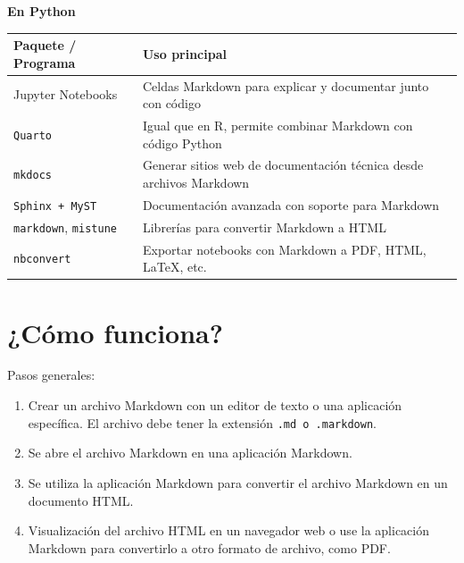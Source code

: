 \documentclass[
  spanish,
  12pt,
  letterpaper,
  DIV=11,
  numbers=noendperiod]{scrreprt}
\newcounter{none} %
\providecommand{\tightlist}{%
  \setlength{\itemsep}{0pt}\setlength{\parskip}{0pt}}
\begin{document}
\textbf{En Python}

{\def\LTcaptype{none} %
\begin{longtable}[]{@{}
  >{\raggedright\arraybackslash}p{}
  >{\raggedright\arraybackslash}p{}@{}}
\toprule\noalign{}
\begin{minipage}[b]{\linewidth}\raggedright
Paquete / Programa
\end{minipage} & \begin{minipage}[b]{\linewidth}\raggedright
Uso principal
\end{minipage} \\
\midrule\noalign{}
\endhead
\bottomrule\noalign{}
\endlastfoot
Jupyter Notebooks & Celdas Markdown para explicar y documentar junto con
código \\
\texttt{Quarto} & Igual que en R, permite combinar Markdown con código
Python \\
\texttt{mkdocs} & Generar sitios web de documentación técnica desde
archivos Markdown \\
\texttt{Sphinx\ +\ MyST} & Documentación avanzada con soporte para
Markdown \\
\texttt{markdown}, \texttt{mistune} & Librerías para convertir Markdown
a HTML \\
\texttt{nbconvert} & Exportar notebooks con Markdown a PDF, HTML, LaTeX,
etc. \\
\end{longtable}
}

\section{¿Cómo funciona?}\label{cuxf3mo-funciona-1}

Pasos generales:

\begin{enumerate}
\def\labelenumi{\arabic{enumi}.}
\tightlist
\item
  Crear un archivo Markdown con un editor de texto o una aplicación
  específica. El archivo debe tener la extensión
  \texttt{.md\ o\ .markdown}.
\item
  Se abre el archivo Markdown en una aplicación Markdown.
\item
  Se utiliza la aplicación Markdown para convertir el archivo Markdown
  en un documento HTML.
\item
  Visualización del archivo HTML en un navegador web o use la aplicación
  Markdown para convertirlo a otro formato de archivo, como PDF.
\end{enumerate}
\end{document}
